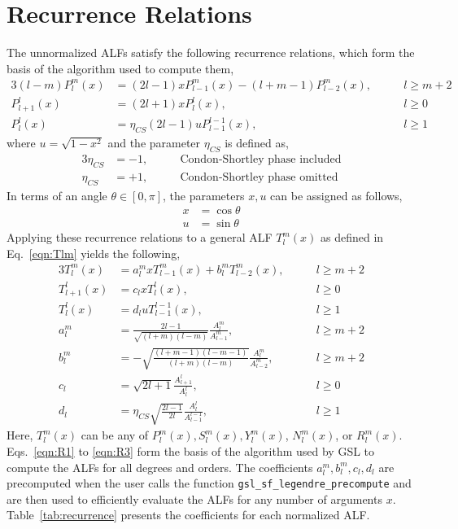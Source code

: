 \documentclass[12pt]{article}
\begin{document}
\section{Recurrence Relations}
\label{sec:recur}

The unnormalized ALFs satisfy the following recurrence relations,
which form the basis of the algorithm used to compute them,
\begin{alignat}{3}
\left(l-m\right) P_l^m(x) &= \left( 2l-1 \right) x P_{l-1}^m(x) - \left( l+m-1 \right) P_{l-2}^m(x), & \qquad l \geq m + 2 \\
P_{l+1}^l(x) &= \left( 2l+1 \right) x P_l^l(x), & \qquad l \geq 0 \\
P_l^l(x) &= \eta_{CS} \left( 2l-1 \right) u P_{l-1}^{l-1}(x), & \qquad l \geq 1
\end{alignat}
where $u = \sqrt{1 - x^2}$ and the parameter $\eta_{CS}$ is defined as,
\begin{alignat}{3}
\eta_{CS} &= -1, & \qquad \textrm{Condon-Shortley phase included} \\
\eta_{CS} &= +1, & \qquad \textrm{Condon-Shortley phase omitted}
\end{alignat}
In terms of an angle $\theta \in [0,\pi]$, the parameters $x,u$ can
be assigned as follows,
\begin{align}
x &= \cos{\theta} \\
u &= \sin{\theta}
\end{align}
Applying these recurrence relations to a general ALF
$T_l^m(x)$ as defined in Eq.~\eqref{eqn:Tlm} yields the following,
\begin{alignat}{3}
T_l^m(x) &= a_l^m x T_{l-1}^m(x) + b_l^m T_{l-2}^m(x), & \qquad l \geq m + 2 \label{eqn:R1} \\
T_{l+1}^l(x) &= c_l x T_l^l(x), & \qquad l \geq 0 \\
T_l^l(x) &= d_l u T_{l-1}^{l-1}(x), & \qquad l \geq 1 \label{eqn:R3} \\
a_l^m &= \frac{2l-1}{\sqrt{(l+m)(l-m)}} \frac{A_l^m}{A_{l-1}^m}, & \qquad l \geq m + 2 \\
b_l^m &= -\sqrt{\frac{(l+m-1)(l-m-1)}{(l+m)(l-m)}} \frac{A_l^m}{A_{l-2}^m}, & \qquad l \geq m + 2 \\
c_l &= \sqrt{2l+1} \frac{A_{l+1}^l}{A_l^l}, & \qquad l \geq 0 \\
d_l &= \eta_{CS} \sqrt{\frac{2l-1}{2l}} \frac{A_l^l}{A_{l-1}^{l-1}}, & \qquad l \geq 1
\end{alignat}
Here, $T_l^m(x)$ can be any of $P_l^m(x), S_l^m(x), Y_l^m(x)$, $N_l^m(x)$,
or $R_l^m(x)$. Eqs.~\eqref{eqn:R1} to \eqref{eqn:R3} form the basis of
the algorithm used by GSL to compute the ALFs for all degrees and orders.
The coefficients $a_l^m,b_l^m,c_l,d_l$ are precomputed when the user
calls the function {\tt gsl\_sf\_legendre\_precompute} and are then
used to efficiently evaluate the ALFs for any number of arguments $x$.
Table~\ref{tab:recurrence} presents the coefficients for each
normalized ALF.
\end{document}
